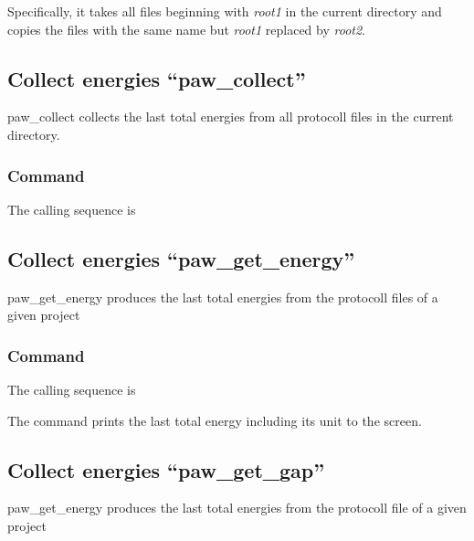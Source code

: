\documentclass[final,12pt]{article}
\begin{document}
{{{Specifically, it takes all files beginning with {\it root1} in the
current directory and copies the files with the same name but {\it
root1} replaced by {\it root2}.

\subsection{Collect energies ``paw\_collect''}
paw\_collect collects the last total energies from all protocoll files
in the current directory.

\subsubsection{Command}
The calling sequence is

\bigskip{}

\subsection{Collect energies ``paw\_get\_energy''}
paw\_get\_energy produces the last total energies from the protocoll files
of a given  project

\subsubsection{Command}
The calling sequence is

\bigskip{}

The command prints the last total energy including its unit to the
screen.

\subsection{Collect energies ``paw\_get\_gap''}
paw\_get\_energy produces the last total energies from the protocoll
file of a given project

}}}
\end{document}
